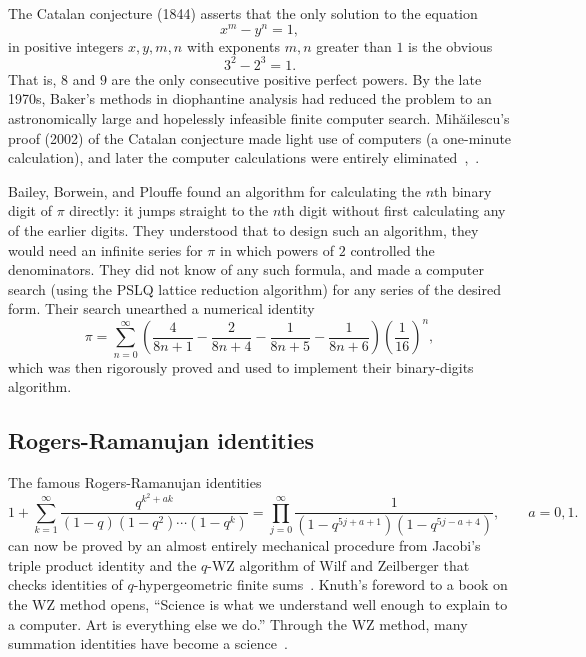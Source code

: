 \documentclass{llncs}
\begin{document}

\smallskip

The Catalan conjecture (1844) asserts that the only solution to the equation
\[
x^m - y^n = 1,
\]
in positive integers $x,y,m,n$ with exponents $m,n$ greater than $1$
is the obvious
\[
3^2 - 2^3 = 1.
\]
That is, $8$ and $9$ are the only consecutive positive perfect powers.
By the late 1970s, Baker's methods in diophantine analysis had reduced
the problem to an astronomically large and hopelessly infeasible finite
computer search.  Mih\u ailescu's proof (2002) of the Catalan
conjecture made light use of computers (a one-minute calculation), and
later the computer calculations were entirely eliminated~\cite{Mih},~\cite{TM03}.

\smallskip



Bailey, Borwein, and Plouffe found an algorithm for calculating the
$n$th binary digit of $\pi$ directly: it jumps straight to the $n$th
digit without first calculating any of the earlier digits.  They
understood that to design such an algorithm, they would need an
infinite series for $\pi$ in which powers of $2$ controlled the
denominators.  They did not know of any such formula, and made a
computer search (using the PSLQ lattice reduction algorithm) for any
series of the desired form.  Their search unearthed a numerical
identity
\[
\pi = \sum_{n=0}^\infty 
\left(
\frac{4}{8n+1} - \frac{2}{8n+4} - \frac{1}{8n+5} - \frac{1}{8n+6}
\right) 
\left(\frac{1}{16}\right)^n,
\]
which was then rigorously proved and used to implement their
binary-digits algorithm.


\subsection{Rogers-Ramanujan identities}

The famous Rogers-Ramanujan identities
\[
1 + \sum_{k=1}^\infty \frac{q^{k^2+a k}}{(1-q)(1-q^2)\cdots (1-q^k)} = 
\prod_{j=0}^\infty \frac{1}{(1-q^{5j+a+1})(1- q^{5j - a +4})},
\qquad a = 0,1.
\]
can now be proved by an almost entirely mechanical procedure from
Jacobi's triple product identity and the $q$-WZ algorithm of Wilf and
Zeilberger that checks identities of $q$-hypergeometric finite
sums~\cite{PP94}.   Knuth's foreword to a book
on the WZ method opens, ``Science is what we understand well enough to
explain to a computer. Art is everything else we do.'' Through the WZ
method, many summation identities have become a science~\cite{PWZ}.
\end{document}
